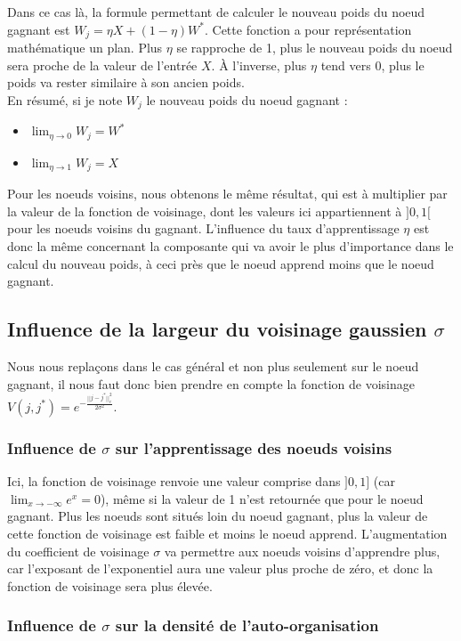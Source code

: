 \documentclass{article}
\begin{document}
Dans ce cas là, la formule permettant de calculer le nouveau poids du noeud gagnant est $W_j = \eta X + (1-\eta) W^*$. Cette fonction a pour représentation mathématique un plan. Plus $\eta$ se rapproche de 1, plus le nouveau poids du noeud sera proche de la valeur de l'entrée $X$. À l'inverse, plus $\eta$ tend vers 0, plus le poids va rester similaire à son ancien poids.
\\En résumé, si je note $W_j$ le nouveau poids du noeud gagnant :
\begin{itemize}
    \item $\lim_{\eta \to 0} W_j = W^*$
    \item $\lim_{\eta \to 1} W_j = X$
\end{itemize}
Pour les noeuds voisins, nous obtenons le même résultat, qui est à multiplier par la valeur de la fonction de voisinage, dont les valeurs ici appartiennent à $]0,1[$ pour les noeuds voisins du gagnant. L'influence du taux d'apprentissage $\eta$ est donc la même concernant la composante qui va avoir le plus d'importance dans le calcul du nouveau poids, à ceci près que le noeud apprend moins que le noeud gagnant.


\subsection{Influence de la largeur du voisinage gaussien $\sigma$}

Nous nous replaçons dans le cas général et non plus seulement sur le noeud gagnant, il nous faut donc bien prendre en compte la fonction de voisinage $V(j,j^*) =  e^{-\frac{||j-j^*||^2_c}{2\sigma^2}}$.

\subsubsection{Influence de $\sigma$ sur l'apprentissage des noeuds voisins}

Ici, la fonction de voisinage renvoie une valeur comprise dans $]0,1]$ (car $\lim_{x \to - \infty} e^x = 0$), même si la valeur de 1 n'est retournée que pour le noeud gagnant. Plus les noeuds sont situés loin du noeud gagnant, plus la valeur de cette fonction de voisinage est faible et moins le noeud apprend.
L'augmentation du coefficient de voisinage $\sigma$ va permettre aux noeuds voisins d'apprendre plus, car l'exposant de l'exponentiel aura une valeur plus proche de zéro, et donc la fonction de voisinage sera plus élevée.


\subsubsection{Influence de $\sigma$ sur la densité de l'auto-organisation}
\end{document}
